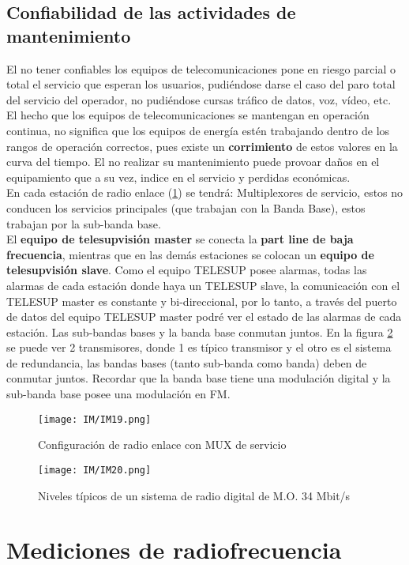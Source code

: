 \documentclass[
	12pt, %
	fleqn, %
	a4paper, %
]{LegrandOrangeBook}
\begin{document}
\subsection{Confiabilidad de las actividades de mantenimiento}
El no tener confiables los equipos de telecomunicaciones pone en riesgo parcial o total el servicio que esperan los usuarios, pudiéndose darse el caso del paro total del servicio del operador, no pudiéndose cursas tráfico de datos, voz, vídeo, etc. El hecho que los equipos de telecomunicaciones se mantengan en operación continua, no significa que los equipos de energía estén trabajando dentro de los rangos de operación correctos, pues existe un \textbf{corrimiento} de estos valores en la curva del tiempo. El no realizar su mantenimiento puede provoar daños en el equipamiento que a su vez, indice en el servicio y perdidas económicas.\\
En cada estación de radio enlace (\ref{fig: radio enlace}) se tendrá: Multiplexores de servicio, estos no conducen los servicios principales (que trabajan con la Banda Base), estos trabajan por la sub-banda base. \\
El \textbf{equipo de telesupvisión master} se conecta  la \textbf{part line de baja frecuencia}, mientras que en las demás estaciones se colocan un \textbf{equipo de telesupvisión slave}. Como el equipo TELESUP posee alarmas, todas las alarmas de cada estación donde haya un TELESUP slave, la comunicación con el TELESUP master es constante y bi-direccional, por lo tanto, a través del puerto de datos del equipo TELESUP master podré ver el estado de las alarmas de cada estación. Las sub-bandas bases y la banda base conmutan juntos. En la figura \ref{fig:niveles tipicos} se puede ver 2 transmisores, donde 1 es típico transmisor y el otro es el sistema de redundancia, las bandas bases (tanto sub-banda como banda) deben de conmutar juntos. Recordar que la banda base tiene una modulación digital y la sub-banda base posee una modulación en FM.
\begin{figure}
\centering
\texttt{[image: IM/IM19.png]}
\label{fig: radio enlace}
\caption{Configuración de radio enlace con MUX de servicio}
\end{figure}
\begin{figure}[H]
\centering
\texttt{[image: IM/IM20.png]}
\label{fig:niveles tipicos}
\caption{Niveles típicos de un sistema de radio digital de M.O. 34 Mbit/s}
\end{figure}
\section{Mediciones de radiofrecuencia}
\end{document}
